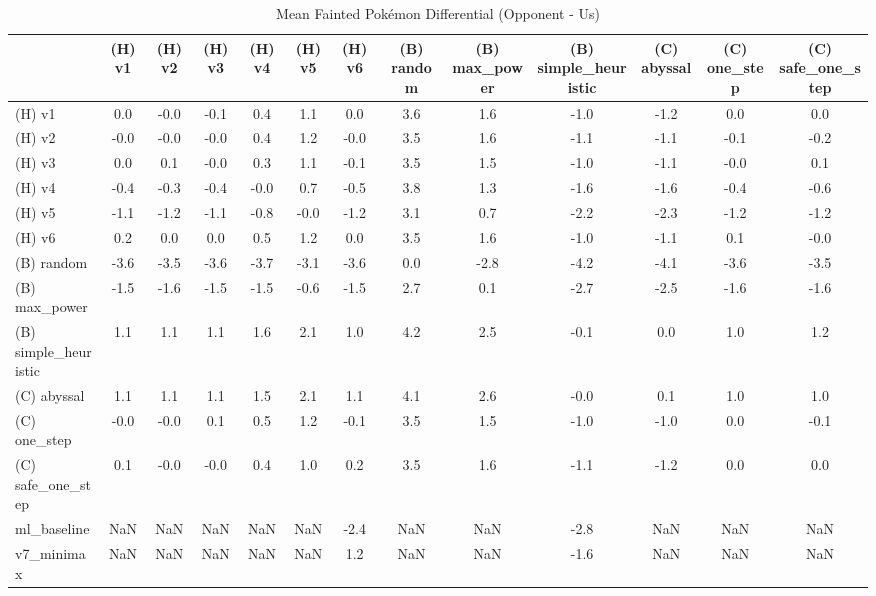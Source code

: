 \begin{table}[htbp]
\caption{Mean Fainted Pokémon Differential (Opponent - Us)}
\label{tab:fainted_diff}
\begin{tabular}{lcccccccccccc}
\hline
 & (H) v1 & (H) v2 & (H) v3 & (H) v4 & (H) v5 & (H) v6 & (B) random & (B) max\_power & (B) simple\_heuristic & (C) abyssal & (C) one\_step & (C) safe\_one\_step \\
\hline
(H) v1 & 0.0 & -0.0 & -0.1 & 0.4 & 1.1 & 0.0 & 3.6 & 1.6 & -1.0 & -1.2 & 0.0 & 0.0 \\
(H) v2 & -0.0 & -0.0 & -0.0 & 0.4 & 1.2 & -0.0 & 3.5 & 1.6 & -1.1 & -1.1 & -0.1 & -0.2 \\
(H) v3 & 0.0 & 0.1 & -0.0 & 0.3 & 1.1 & -0.1 & 3.5 & 1.5 & -1.0 & -1.1 & -0.0 & 0.1 \\
(H) v4 & -0.4 & -0.3 & -0.4 & -0.0 & 0.7 & -0.5 & 3.8 & 1.3 & -1.6 & -1.6 & -0.4 & -0.6 \\
(H) v5 & -1.1 & -1.2 & -1.1 & -0.8 & -0.0 & -1.2 & 3.1 & 0.7 & -2.2 & -2.3 & -1.2 & -1.2 \\
(H) v6 & 0.2 & 0.0 & 0.0 & 0.5 & 1.2 & 0.0 & 3.5 & 1.6 & -1.0 & -1.1 & 0.1 & -0.0 \\
(B) random & -3.6 & -3.5 & -3.6 & -3.7 & -3.1 & -3.6 & 0.0 & -2.8 & -4.2 & -4.1 & -3.6 & -3.5 \\
(B) max\_power & -1.5 & -1.6 & -1.5 & -1.5 & -0.6 & -1.5 & 2.7 & 0.1 & -2.7 & -2.5 & -1.6 & -1.6 \\
(B) simple\_heuristic & 1.1 & 1.1 & 1.1 & 1.6 & 2.1 & 1.0 & 4.2 & 2.5 & -0.1 & 0.0 & 1.0 & 1.2 \\
(C) abyssal & 1.1 & 1.1 & 1.1 & 1.5 & 2.1 & 1.1 & 4.1 & 2.6 & -0.0 & 0.1 & 1.0 & 1.0 \\
(C) one\_step & -0.0 & -0.0 & 0.1 & 0.5 & 1.2 & -0.1 & 3.5 & 1.5 & -1.0 & -1.0 & 0.0 & -0.1 \\
(C) safe\_one\_step & 0.1 & -0.0 & -0.0 & 0.4 & 1.0 & 0.2 & 3.5 & 1.6 & -1.1 & -1.2 & 0.0 & 0.0 \\
ml\_baseline & NaN & NaN & NaN & NaN & NaN & -2.4 & NaN & NaN & -2.8 & NaN & NaN & NaN \\
v7\_minimax & NaN & NaN & NaN & NaN & NaN & 1.2 & NaN & NaN & -1.6 & NaN & NaN & NaN \\
\hline
\end{tabular}
\end{table}
